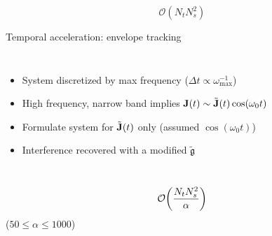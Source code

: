 \documentclass[aspectratio=169, usenames, dvipsnames]{beamer}
\begin{document}
\begin{frame}[standout]
  \begingroup
    \Huge
    \begin{equation*}
      \mathcal{O}(N_t N_s^2)
    \end{equation*}
  \endgroup
\end{frame}

\begin{frame}{Temporal acceleration: envelope tracking}
  \begin{columns}
      \begin{itemize}
        \item System discretized by max frequency ($\Delta t \propto \omega_\text{max}^{-1}$)
        \item High frequency, narrow band implies $\vb{J}(t) \sim \tilde{\vb{J}}(t)\cos(\omega_0 t)$
        \item Formulate system for $\tilde{\vb{J}}(t)$ only (assumed $\cos(\omega_0 t)$)
        \item Interference recovered with a modified $\tilde{\mathfrak{g}}$
      \end{itemize}

      \vspace{0.5cm}
      
  \end{columns}
\end{frame}

\begin{frame}[standout]
  \begingroup
    \Huge
    \begin{equation*}
      \mathcal{O}\qty(\frac{N_t N_s^2}{\alpha})
    \end{equation*}
  \endgroup
  \vfill
  \hfill ($50 \leqslant \alpha \leqslant 1000$)
\end{frame}
\end{document}
